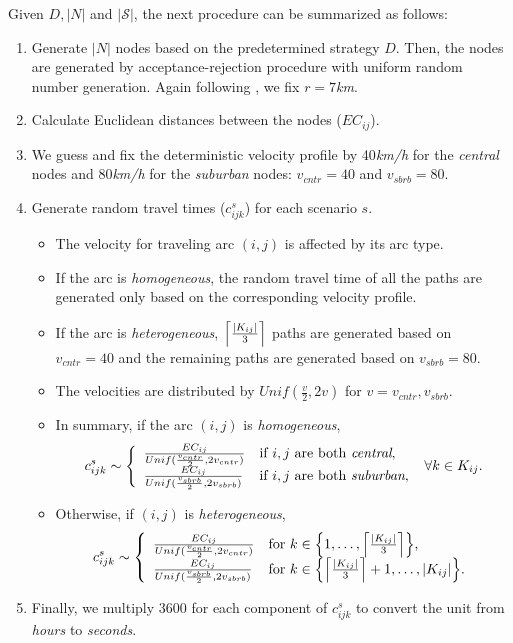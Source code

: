 Given $D,|N|$ and $|\mathcal{S}|$, the next procedure can be summarized as follows:
\begin{enumerate}
	\item Generate $|N|$ nodes based on the predetermined strategy $D$. Then, the nodes are generated by acceptance-rejection procedure with uniform random number generation. Again following \cite{journal:TPP2017}, we fix $r=7$\textit{km}. 
	\item Calculate Euclidean distances between the nodes ($EC_{ij}$).
	\item We guess and fix the deterministic velocity profile by 40\textit{km/h} for the \textit{central} nodes and 80\textit{km/h} for the \textit{suburban} nodes: $v_{cntr}=40$ and $v_{sbrb}=80$.
	\item Generate random travel times ($c_{ijk}^{s}$) for each scenario $s$.
	\begin{itemize}
		\item The velocity for traveling arc $(i,j)$ is affected by its arc type.
		\item If the arc is \textit{homogeneous}, the random travel time of all the paths are generated only based on the corresponding velocity profile.
		\item If the arc is \textit{heterogeneous}, $\ceil*{\frac{|K_{ij}|}{3}}$ paths are generated based on $v_{cntr}=40$ and the remaining paths are generated based on $v_{sbrb}=80$. 
		\item The velocities are distributed by $Unif(\frac{v}{2},2v)$ for $v=v_{cntr},v_{sbrb}$.
		\item In summary, if the arc $(i,j)$ is \textit{homogeneous}, 
		\begin{align*}
		c_{ijk}^{s}\sim\left\{ \begin{array}{ll} \frac{EC_{ij}}{Unif(\frac{v_{cntr}}{2},2v_{cntr})} & \textrm{if $i,j$ are both \textit{central},} \\
		\frac{EC_{ij}}{Unif(\frac{v_{sbrb}}{2},2v_{sbrb})} & \textrm{if $i,j$ are both \textit{suburban},}	\end{array} \right.\ \forall k\in K_{ij}.
		\end{align*}
		\item Otherwise, if $(i,j)$ is \textit{heterogeneous},
		\begin{align*}
		c_{ijk}^{s}\sim\left\{ \begin{array}{ll} \frac{EC_{ij}}{Unif(\frac{v_{cntr}}{2},2v_{cntr})} & \textrm{for $k\in\left\{1,\ldots,\ceil*{\frac{|K_{ij}|}{3}}\right\}$,} \\
		\frac{EC_{ij}}{Unif(\frac{v_{sbrb}}{2},2v_{sbrb})} & \textrm{for $k\in\left\{\ceil*{\frac{|K_{ij}|}{3}}+1,\ldots,|K_{ij}|\right\}$.}	\end{array} \right.
		\end{align*}
	\end{itemize}
	\item Finally, we multiply 3600 for each component of $c_{ijk}^{s}$ to convert the unit from \textit{hours} to \textit{seconds}.
\end{enumerate}

